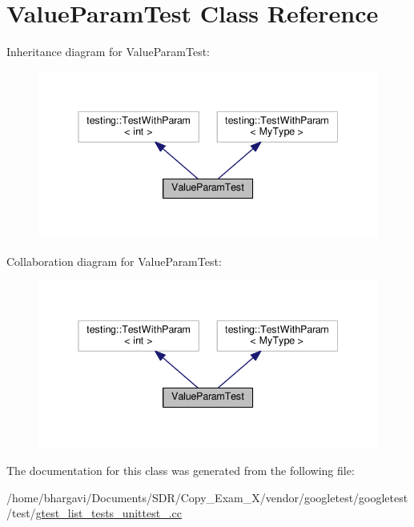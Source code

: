 \hypertarget{class_value_param_test}{}\section{Value\+Param\+Test Class Reference}
\label{class_value_param_test}


Inheritance diagram for Value\+Param\+Test\+:
\nopagebreak
\begin{figure}[H]
\begin{center}
\leavevmode
\includegraphics[width=338pt]{class_value_param_test__inherit__graph}
\end{center}
\end{figure}


Collaboration diagram for Value\+Param\+Test\+:
\nopagebreak
\begin{figure}[H]
\begin{center}
\leavevmode
\includegraphics[width=338pt]{class_value_param_test__coll__graph}
\end{center}
\end{figure}


The documentation for this class was generated from the following file\+:\begin{DoxyCompactItemize}
\item 
/home/bhargavi/\+Documents/\+S\+D\+R/\+Copy\+\_\+\+Exam\+\_\+X/vendor/googletest/googletest/test/\hyperlink{gtest__list__tests__unittest___8cc}{gtest\+\_\+list\+\_\+tests\+\_\+unittest\+\_\+.\+cc}\end{DoxyCompactItemize}
